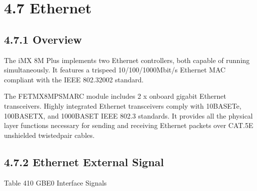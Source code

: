 \documentclass[letterpaper,10pt,openany,english]{sphinxmanual}
\begin{document}
\section{4.7 Ethernet}
\label{\detokenize{hardware:ethernet}}

\subsection{4.7.1 Overview}
\label{\detokenize{hardware:id9}}
\sphinxAtStartPar
The iMX 8M Plus implements two Ethernet controllers, both capable of running simultaneously. It features a tri\sphinxhyphen{}speed 10/100/1000\sphinxhyphen{}Mbit/s Ethernet MAC compliant with the IEEE 802.3\sphinxhyphen{}2002 standard.

\sphinxAtStartPar
The FET\sphinxhyphen{}MX8MP\sphinxhyphen{}SMARC module includes 2 x on\sphinxhyphen{}board gigabit Ethernet transceivers. Highly integrated Ethernet transceivers comply with 10BASE\sphinxhyphen{}Te, 100BASE\sphinxhyphen{}TX, and 1000BASE\sphinxhyphen{}T IEEE 802.3 standards. It provides all the physical layer functions necessary for sending and receiving Ethernet packets over CAT.5E unshielded twisted\sphinxhyphen{}pair cables.


\subsection{4.7.2 Ethernet External Signal}
\label{\detokenize{hardware:ethernet-external-signal}}
\sphinxAtStartPar
Table 4\sphinxhyphen{}10 GBE0 Interface Signals
\end{document}
